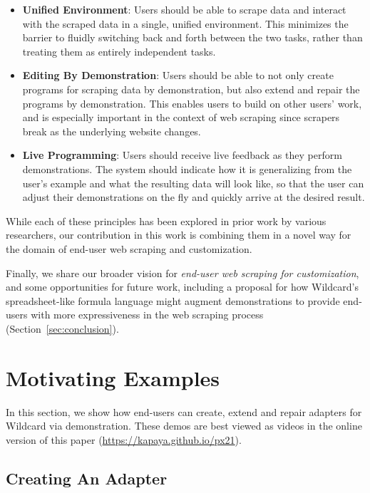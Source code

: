 \documentclass[sigconf,10pt]{acmart}
\providecommand{\tightlist}{%
  \setlength{\itemsep}{0pt}\setlength{\parskip}{0pt}}
\begin{document}
\begin{itemize}
\tightlist
\item
  \textbf{Unified Environment}: Users should be able to scrape data and
  interact with the scraped data in a single, unified environment. This
  minimizes the barrier to fluidly switching back and forth between the
  two tasks, rather than treating them as entirely independent tasks.
\item
  \textbf{Editing By Demonstration}: Users should be able to not only
  create programs for scraping data by demonstration, but also extend
  and repair the programs by demonstration. This enables users to build
  on other users' work, and is especially important in the context of
  web scraping since scrapers break as the underlying website changes.
\item
  \textbf{Live Programming}: Users should receive live feedback as they
  perform demonstrations. The system should indicate how it is
  generalizing from the user's example and what the resulting data will
  look like, so that the user can adjust their demonstrations on the fly
  and quickly arrive at the desired result.
\end{itemize}

While each of these principles has been explored in prior work by
various researchers, our contribution in this work is combining them in
a novel way for the domain of end-user web scraping and customization.

Finally, we share our broader vision for \emph{end-user web scraping for
customization}, and some opportunities for future work, including a
proposal for how Wildcard's spreadsheet-like formula language might
augment demonstrations to provide end-users with more expressiveness in
the web scraping process (Section~\ref{sec:conclusion}).

\hypertarget{sec:demos}{%
\section{Motivating Examples}\label{sec:demos}}

In this section, we show how end-users can create, extend and repair
adapters for Wildcard via demonstration.{ These demos are best viewed as
videos in the online version of this paper
(\url{https://kapaya.github.io/px21}).}

\hypertarget{creating-an-adapter}{%
\subsection{Creating An Adapter}\label{creating-an-adapter}}
\end{document}
